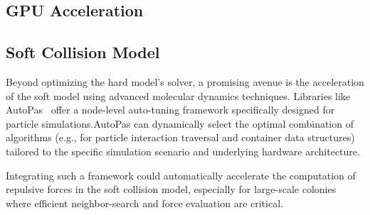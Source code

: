 \documentclass[conference]{IEEEtran}
\begin{document}
\subsection{GPU Acceleration}

\cite{Tasora2008}

\subsection{Soft Collision Model}

Beyond optimizing the hard model's solver, a promising avenue is the acceleration of the soft model using advanced molecular dynamics techniques. Libraries like AutoPas~\cite{AutoPasGithub,Gratl2019,Newcome2023} offer a node-level auto-tuning framework specifically designed for particle simulations.AutoPas can dynamically select the optimal combination of algorithms (e.g., for particle interaction traversal and container data structures) tailored to the specific simulation scenario and underlying hardware architecture.

Integrating such a framework could automatically accelerate the computation of repulsive forces in the soft collision model, especially for large-scale colonies where efficient neighbor-search and force evaluation are critical.

\newpage

\balance


\newpage
\nobalance



\onecolumn

\appendix

\renewcommand{\thefigure}{A\arabic{figure}}
\renewcommand{\thetable}{A.\arabic{table}}
\setcounter{figure}{0}
\setcounter{table}{0}
\end{document}
